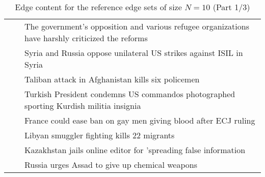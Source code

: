 \begin{table}[H]
\begin{tabular}{cc p{10cm}}
 &  & The government's opposition and various refugee organizations have harshly criticized the reforms \\
 &  & Syria and Russia oppose unilateral US strikes against ISIL in Syria \\
 &  & Taliban attack in Afghanistan kills six policemen \\
 &  & Turkish President condemns US commandos photographed sporting Kurdish militia insignia \\
 &  & France could ease ban on gay men giving blood after ECJ ruling \\
 &  & Libyan smuggler fighting kills 22 migrants \\
 &  & Kazakhstan jails online editor for 'spreading false information \\
 &  & Russia urges Assad to give up chemical weapons \\
\bottomrule
\end{tabular}
\caption{Edge content for the reference edge sets of size \(N = 10\) (Part 1/3)}
\label{tab:ref-edge-sets-nref-10-part-1}
\end{table}

